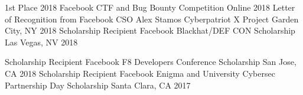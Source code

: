 




\begin{cvhonors}
  \cvhonor
  {1st Place} %
  {2018 Facebook CTF and Bug Bounty Competition} %
  {Online} %
  {2018} %
\cvhonor 
{Letter of Recognition from Facebook CSO Alex Stamos}
{Cyberpatriot X Project} %
{Garden City, NY} %
{2018} %
  \cvhonor
  {Scholarship Recipient} %
  {Facebook Blackhat/DEF CON Scholarship} %
  {Las Vegas, NV} %
  {2018} %


    \cvhonor
    {Scholarship Recipient} %
    {Facebook F8 Developers Conference Scholarship} %
    {San Jose, CA} %
    {2018} %
  \cvhonor
    {Scholarship Recipient} %
    {Facebook Enigma and University Cybersec Partnership Day Scholarship} %
    {Santa Clara, CA} %
    {2017} %

\end{cvhonors}
